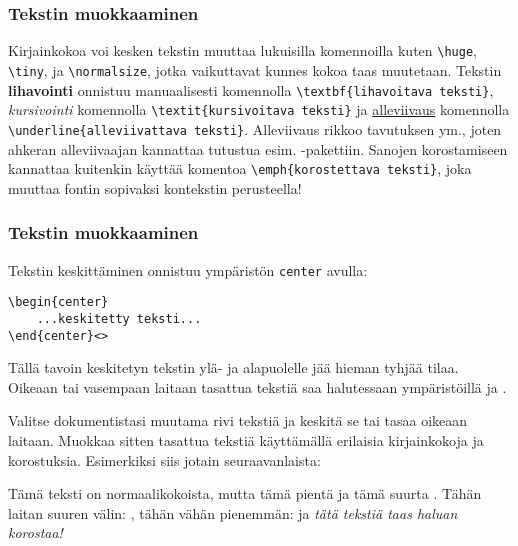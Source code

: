 \begin{fframe}
    \frametitle{Tekstin muokkaaminen}
    Kirjainkokoa voi kesken tekstin muuttaa lukuisilla komennoilla kuten \lstinline-\huge-, \lstinline-\tiny-, ja \lstinline-\normalsize-, jotka vaikuttavat kunnes kokoa taas muutetaan. 
    \vaihto\pause
    Tekstin \textbf{lihavointi} onnistuu manuaalisesti komennolla \lstinline-\textbf{lihavoitava teksti}-, \textit{kursivointi} komennolla \lstinline-\textit{kursivoitava teksti}- ja \underline{alleviivaus} komennolla \lstinline-\underline{alleviivattava teksti}-. Alleviivaus rikkoo tavutuksen ym., joten ahkeran alleviivaajan kannattaa tutustua esim. -pakettiin.
    \vaihto\pause
    Sanojen korostamiseen kannattaa kuitenkin käyttää komentoa \verb-\emph{korostettava teksti}-, joka muuttaa fontin sopivaksi kontekstin perusteella!
\end{fframe}

\begin{fframe}
    \frametitle{Tekstin muokkaaminen}
    Tekstin keskittäminen onnistuu ympäristön \verb-center- avulla:
    \begin{lstlisting}
\begin{center}
    ...keskitetty teksti...
\end{center}<>
    \end{lstlisting}
    Tällä tavoin keskitetyn tekstin ylä- ja alapuolelle jää hieman tyhjää tilaa. \vaihto\pause
    Oikeaan tai vasempaan laitaan tasattua tekstiä saa halutessaan ympäristöillä  ja .

\end{fframe}
\begin{fframe}
    \begin{harj}
        Valitse dokumentistasi muutama rivi tekstiä ja keskitä se tai tasaa oikeaan laitaan. Muokkaa sitten tasattua tekstiä käyttämällä erilaisia kirjainkokoja ja korostuksia. Esimerkiksi siis jotain seuraavanlaista:
        \begin{sample}
            \begin{flushright}
                Tämä teksti on normaalikokoista, \tiny mutta tämä pientä ja \huge tämä suurta \normalsize. Tähän laitan suuren välin: \qquad, tähän vähän pienemmän: \quad ja \emph{tätä tekstiä taas haluan korostaa!}
            \end{flushright}
        \end{sample}
    \end{harj}
\end{fframe}


